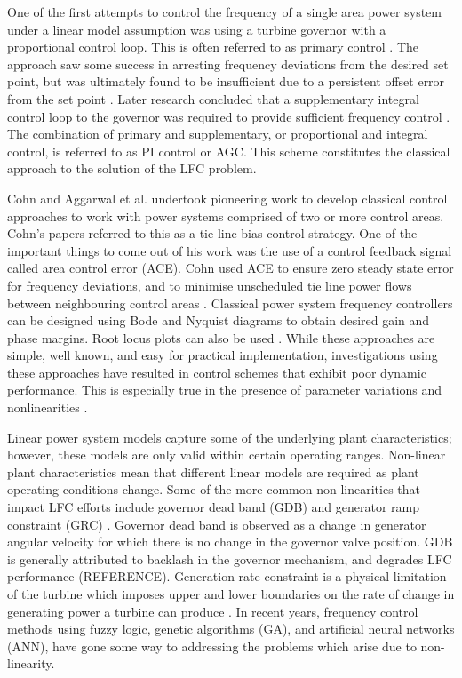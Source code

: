 One of the first attempts to control the frequency of a single area power system under a linear model assumption was using a turbine governor with a proportional control loop. This is often referred to as primary control \cite{Bevrani2011}. The approach saw some success in arresting frequency deviations from the desired set point, but was ultimately found to be insufficient due to a persistent offset error from the set point \cite{Saadat}. Later research concluded that a supplementary integral control loop to the governor was required to provide sufficient frequency control \cite{Elgerd1970}. The combination of primary and supplementary, or proportional and integral control, is referred to as PI control or AGC. This scheme constitutes the classical approach to the solution of the LFC problem.

Cohn \cite{Cohn1971} and Aggarwal et al. \cite{Aggarwal1968, Aggarwal1968a} undertook pioneering work to develop classical control approaches to work with power systems comprised of two or more control areas. Cohn's papers referred to this as a tie line bias control strategy. One of the important things to come out of his work was the use of a control feedback signal called area control error (ACE). Cohn used ACE to ensure zero steady state error for frequency deviations, and to minimise unscheduled tie line power flows between neighbouring control areas \cite{Cohn1956}. Classical power system frequency controllers can be designed using Bode and Nyquist diagrams to obtain desired gain and phase margins. Root locus plots can also be used \cite{Ogat2010}. While these approaches are simple, well known, and easy for practical implementation, investigations using these approaches have resulted in control schemes that exhibit poor dynamic performance. This is especially true in the presence of parameter variations and nonlinearities \cite{Kundur1994, Elgerd1970, Bechert1977}.

Linear power system models capture some of the underlying plant characteristics; however, these models are only valid within certain operating ranges. Non-linear plant characteristics mean that different linear models are required as plant operating conditions change. Some of the more common non-linearities that impact LFC efforts include governor dead band (GDB) \cite{Concordia1957} and generator ramp constraint (GRC) \cite{Kwatny1975, Elgerd1994}. Governor dead band is observed as a change in generator angular velocity for which there is no change in the governor valve position. GDB is generally attributed to backlash in the governor mechanism, and degrades LFC performance (REFERENCE). Generation rate constraint is a physical limitation of the turbine which imposes upper and lower boundaries on the rate of change in generating power a turbine can produce \cite{Morsali2014}. In recent years, frequency control methods using fuzzy logic, genetic algorithms (GA), and artificial neural networks (ANN), have gone some way to addressing the problems which arise due to non-linearity.

